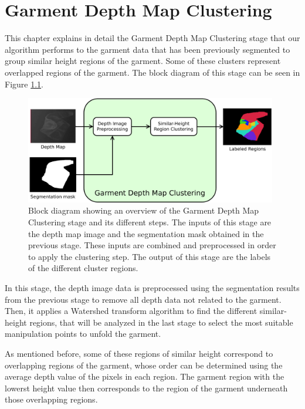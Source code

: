 \chapter{Garment Depth Map Clustering}
\label{garment_clustering}

This chapter explains in detail the Garment Depth Map Clustering stage that our algorithm performs to the garment data that has been previously segmented to group similar height regions of the garment. Some of these clusters represent overlapped regions of the garment. The block diagram of this stage can be seen in Figure \ref{fig:garment_clustering_blocks}.

\begin{figure}[thpb]
    \centering
    \includegraphics[width=0.98\textwidth]
    {figures/Garment-depthmap-diagram.pdf}
    \caption[Block diagram showing an overview of the Garment Depth Map Clustering stage and its different steps.]
    {Block diagram showing an overview of the Garment Depth Map Clustering stage and its different steps. The inputs of this stage are the depth map image and the segmentation mask obtained in the previous stage. These inputs are combined and preprocessed in order to apply the clustering step. The output of this stage are the labels of the different cluster regions.}
    \label{fig:garment_clustering_blocks}
\end{figure}

In this stage, the depth image data is preprocessed using the segmentation results from the previous stage to remove all depth data not related to the garment. Then, it applies a Watershed transform algorithm to find the different similar-height regions, that will be analyzed in the last stage to select the most suitable manipulation points to unfold the garment. 

As mentioned before, some of these regions of similar height correspond to overlappìng regions of the garment, whose order can be determined using the average depth value of the pixels in each region. The garment region with the lowerst height value then corresponds to the region of the garment underneath those overlapping regions.

